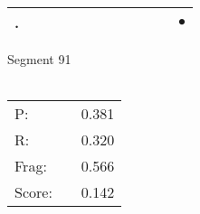 \documentclass[landscape]{article}
\newcommand{\ssp}{\hspace{2pt}}
\newcommand{\mex}{\cellcolor{g}$\bullet$}
\begin{document}
\begin{tabular}{|l|p{10pt}|p{10pt}|p{10pt}|p{10pt}|p{10pt}|p{10pt}|p{10pt}|p{10pt}|p{10pt}|p{10pt}|p{10pt}|}
\hline
\ssp \cellcolor{ref10}. \ssp&\hspace{2pt}&\hspace{2pt}&\hspace{2pt}&\hspace{2pt}&\hspace{2pt}&\hspace{2pt}&\hspace{2pt}&\hspace{2pt}&\hspace{2pt}&\hspace{2pt}&\hspace{2pt}\mex\\
\hline
\end{tabular}

\vspace{6pt}
\noindent Segment 91\\\\
\noindent\begin{tabular}{lm{12pt}r}
\hline
P:&&0.381\\
R:&&0.320\\
Frag:&&0.566\\
Score:&&0.142\\
\end{tabular}

\newpage
\end{document}
